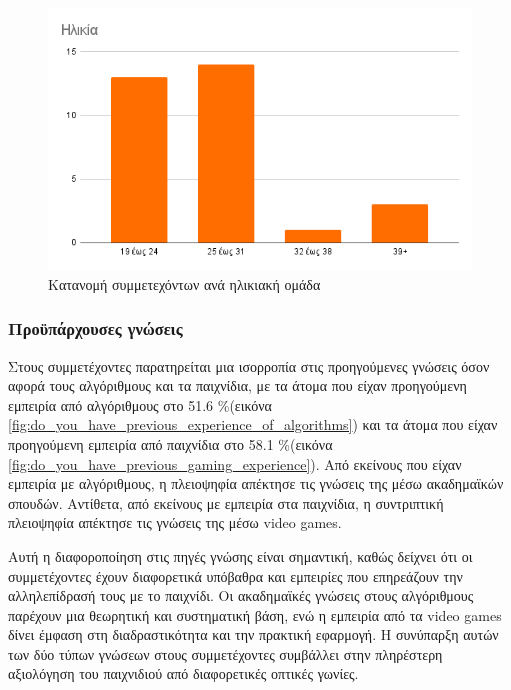 \begin{figure}[H]
    \centering
    \includegraphics[width=0.7\linewidth]{sections/5/2/images/age}
    \caption{Κατανομή συμμετεχόντων ανά ηλικιακή ομάδα}
    \label{fig:age}
\end{figure}


\subsubsection{Προϋπάρχουσες γνώσεις}

Στους συμμετέχοντες παρατηρείται μια ισορροπία στις προηγούμενες γνώσεις όσον αφορά τους αλγόριθμους και τα παιχνίδια, με τα άτομα που είχαν προηγούμενη εμπειρία από αλγόριθμους στο 51.6 \%(εικόνα \ref{fig:do_you_have_previous_experience_of_algorithms}) και τα άτομα που είχαν προηγούμενη εμπειρία από παιχνίδια στο 58.1 \%(εικόνα \ref{fig:do_you_have_previous_gaming_experience}). Από εκείνους που είχαν εμπειρία με αλγόριθμους, η πλειοψηφία απέκτησε τις γνώσεις της μέσω ακαδημαϊκών σπουδών. Αντίθετα, από εκείνους με εμπειρία στα παιχνίδια, η συντριπτική πλειοψηφία απέκτησε τις γνώσεις της μέσω video games.

Αυτή η διαφοροποίηση στις πηγές γνώσης είναι σημαντική, καθώς δείχνει ότι οι συμμετέχοντες έχουν διαφορετικά υπόβαθρα και εμπειρίες που επηρεάζουν την αλληλεπίδρασή τους με το παιχνίδι. Οι ακαδημαϊκές γνώσεις στους αλγόριθμους παρέχουν μια θεωρητική και συστηματική βάση, ενώ η εμπειρία από τα video games δίνει έμφαση στη διαδραστικότητα και την πρακτική εφαρμογή. Η συνύπαρξη αυτών των δύο τύπων γνώσεων στους συμμετέχοντες συμβάλλει στην πληρέστερη αξιολόγηση του παιχνιδιού από διαφορετικές οπτικές γωνίες.

